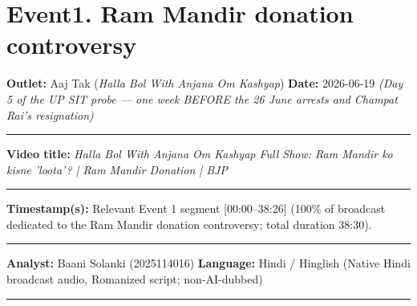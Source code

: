 \documentclass[10pt,a4paper]{article}
\newcommand{\formrule}{\par\vspace{3pt}\noindent\rule{\textwidth}{0.35pt}\par\vspace{7pt}}
\newcommand{\sectionrule}{\par\vspace{4pt}\noindent\rule{\textwidth}{0.4pt}\par\vspace{8pt}}
\begin{document}
\vspace{4pt}

\newpage


\section*{Event1. Ram Mandir donation controversy}
\par\vspace{6pt}
\noindent\textbf{Outlet:} Aaj Tak (\emph{Halla Bol With Anjana Om Kashyap}) \hfill \textbf{Date:} 2026-06-19 \emph{(Day 5 of the UP SIT probe --- one week BEFORE the 26 June arrests and Champat Rai's resignation)}
\formrule
\noindent\textbf{Video title:} \emph{Halla Bol With Anjana Om Kashyap Full Show: Ram Mandir ko kisne 'loota'? | Ram Mandir Donation | BJP}
\formrule
\noindent\textbf{Timestamp(s):} Relevant Event 1 segment [00:00--38:26] (100\% of broadcast dedicated to the Ram Mandir donation controversy; total duration 38:30).
\formrule
\noindent\textbf{Analyst:} Baani Solanki (2025114016) \hfill \textbf{Language:} Hindi / Hinglish (Native Hindi broadcast audio, Romanized script; non-AI-dubbed)
\sectionrule
\end{document}
